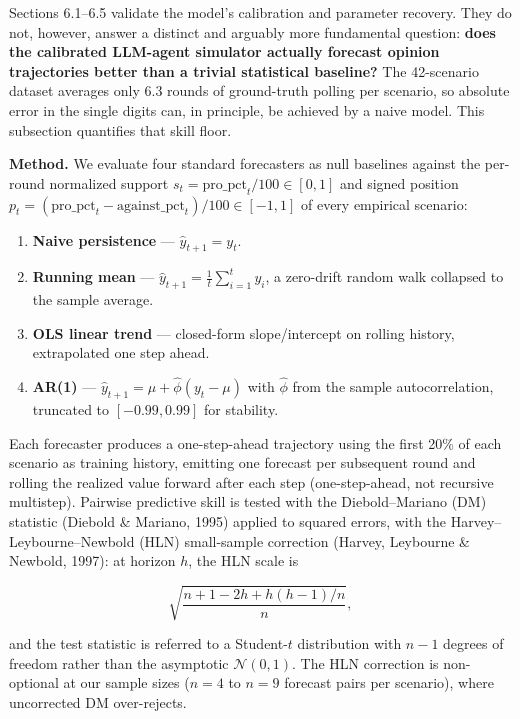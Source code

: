 \documentclass[
]{article}
\providecommand{\tightlist}{%
  \setlength{\itemsep}{0pt}\setlength{\parskip}{0pt}}
\begin{document}
Sections 6.1--6.5 validate the model's calibration and parameter
recovery. They do not, however, answer a distinct and arguably more
fundamental question: \textbf{does the calibrated LLM-agent simulator
actually forecast opinion trajectories better than a trivial statistical
baseline?} The 42-scenario dataset averages only 6.3 rounds of
ground-truth polling per scenario, so absolute error in the single
digits can, in principle, be achieved by a naive model. This subsection
quantifies that skill floor.

\textbf{Method.} We evaluate four standard forecasters as null baselines
against the per-round normalized support
\(s_t = \text{pro\_pct}_t / 100 \in [0, 1]\) and signed position
\(p_t = (\text{pro\_pct}_t - \text{against\_pct}_t)/100 \in [-1, 1]\) of
every empirical scenario:

\begin{enumerate}
\def\labelenumi{\arabic{enumi}.}
\tightlist
\item
  \textbf{Naive persistence} --- \(\hat{y}_{t+1} = y_t\).
\item
  \textbf{Running mean} ---
  \(\hat{y}_{t+1} = \frac{1}{t} \sum_{i=1}^{t} y_i\), a zero-drift
  random walk collapsed to the sample average.
\item
  \textbf{OLS linear trend} --- closed-form slope/intercept on rolling
  history, extrapolated one step ahead.
\item
  \textbf{AR(1)} --- \(\hat{y}_{t+1} = \mu + \hat{\phi}(y_t - \mu)\)
  with \(\hat\phi\) from the sample autocorrelation, truncated to
  \([-0.99, 0.99]\) for stability.
\end{enumerate}

Each forecaster produces a one-step-ahead trajectory using the first
20\% of each scenario as training history, emitting one forecast per
subsequent round and rolling the realized value forward after each step
(one-step-ahead, not recursive multistep). Pairwise predictive skill is
tested with the Diebold--Mariano (DM) statistic (Diebold \& Mariano,
1995) applied to squared errors, with the Harvey--Leybourne--Newbold
(HLN) small-sample correction (Harvey, Leybourne \& Newbold, 1997): at
horizon \(h\), the HLN scale is

\[
\sqrt{\frac{n + 1 - 2h + h(h-1)/n}{n}},
\]

and the test statistic is referred to a Student-\(t\) distribution with
\(n - 1\) degrees of freedom rather than the asymptotic
\(\mathcal{N}(0, 1)\). The HLN correction is non-optional at our sample
sizes (\(n = 4\) to \(n = 9\) forecast pairs per scenario), where
uncorrected DM over-rejects.
\end{document}
